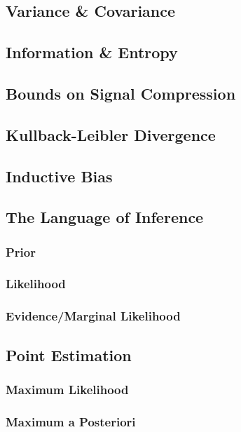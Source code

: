 \documentclass[10pt]{article}
\begin{document}
\subsection{Variance \& Covariance}

\subsection{Information \& Entropy}

\subsection{Bounds on Signal Compression}

\subsection{Kullback-Leibler Divergence}

\subsection{Inductive Bias}

\subsection{The Language of Inference}

\subsubsection{Prior}

\subsubsection{Likelihood}

\subsubsection{Evidence/Marginal Likelihood}

\subsection{Point Estimation}

\subsubsection{Maximum Likelihood}

\subsubsection{Maximum a Posteriori}
\end{document}
